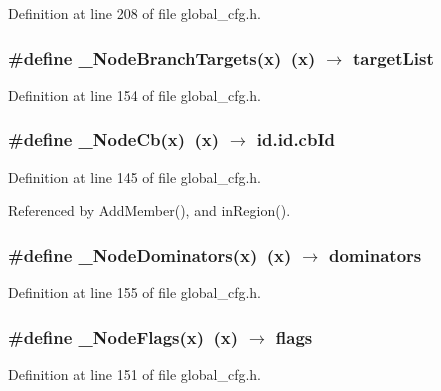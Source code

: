 Definition at line 208 of file global\_\-cfg.h.
\subsubsection{\setlength{\rightskip}{0pt plus 5cm}\#define \_\-Node\-Branch\-Targets(x)~(x) $\rightarrow$ target\-List}\label{global__cfg_8h_815a2915d3e39dbdc4420db38945700a}




Definition at line 154 of file global\_\-cfg.h.
\subsubsection{\setlength{\rightskip}{0pt plus 5cm}\#define \_\-Node\-Cb(x)~(x) $\rightarrow$ id.id.cb\-Id}\label{global__cfg_8h_447767a1b0ea5fdec77d8f3fe5b0e6ac}




Definition at line 145 of file global\_\-cfg.h.

Referenced by Add\-Member(), and in\-Region().
\subsubsection{\setlength{\rightskip}{0pt plus 5cm}\#define \_\-Node\-Dominators(x)~(x) $\rightarrow$ dominators}\label{global__cfg_8h_4e8de9b97e4b87c3fc80b2a00189c6ec}




Definition at line 155 of file global\_\-cfg.h.
\subsubsection{\setlength{\rightskip}{0pt plus 5cm}\#define \_\-Node\-Flags(x)~(x) $\rightarrow$ flags}\label{global__cfg_8h_ee9f4a679a0a5210f611b99f56d8d45c}




Definition at line 151 of file global\_\-cfg.h.
